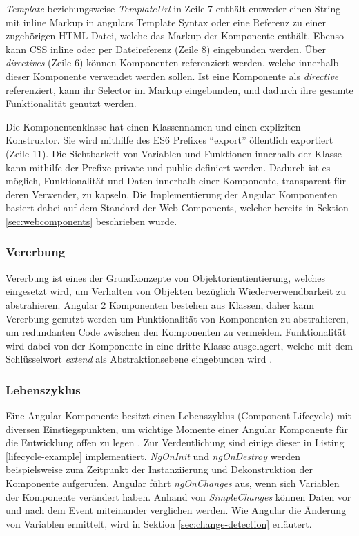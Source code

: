 \emph{Template} beziehungsweise \emph{TemplateUrl} in Zeile 7 enthält entweder einen String mit inline Markup in angulars Template Syntax
oder eine Referenz zu einer zugehörigen HTML Datei, welche das Markup der Komponente enthält.
Ebenso kann \ac{CSS} inline oder per Dateireferenz (Zeile 8) eingebunden werden.
Über \emph{directives} (Zeile 6) können Komponenten referenziert werden, welche innerhalb dieser Komponente verwendet werden sollen.
Ist eine Komponente als \emph{directive} referenziert,
kann ihr Selector im Markup eingebunden,
und dadurch ihre gesamte Funktionalität genutzt werden.

Die Komponentenklasse hat einen Klassennamen und einen expliziten Konstruktor.
Sie wird mithilfe des ES6 Prefixes ``export'' öffentlich exportiert (Zeile 11).
Die Sichtbarkeit von Variablen und Funktionen innerhalb der Klasse kann mithilfe der Prefixe private und public definiert werden.
Dadurch ist es möglich, Funktionalität und Daten innerhalb einer Komponente, transparent für deren Verwender, zu kapseln.
Die Implementierung der Angular Komponenten basiert dabei auf dem Standard der Web Components, welcher bereits in Sektion \ref{sec:webcomponents} beschrieben wurde.

\newpage




\subsubsection{Vererbung}

Vererbung ist eines der Grundkonzepte von Objektorientientierung,
welches eingesetzt wird, um Verhalten von Objekten bezüglich Wiederverwendbarkeit zu
abstrahieren. Angular 2 Komponenten bestehen aus Klassen, daher
kann Vererbung genutzt werden um Funktionalität von Komponenten zu abstrahieren,
um redundanten Code zwischen den Komponenten
zu vermeiden. Funktionalität wird dabei von der Komponente in eine dritte Klasse ausgelagert,
welche mit dem Schlüsselwort \emph{extend} als
Abstraktionsebene eingebunden wird \cite{DanWa45:online}.

\subsubsection{Lebenszyklus}
Eine Angular Komponente besitzt einen Lebenszyklus (Component Lifecycle) mit diversen Einstiegspunkten,
um wichtige Momente einer Angular Komponente für die Entwicklung offen zu legen \cite[837-839]{ng-Book-2}.
Zur Verdeutlichung sind einige dieser in Listing \ref{lifecycle-example} implementiert.
\emph{NgOnInit} und \emph{ngOnDestroy} werden beispielsweise zum Zeitpunkt der Instanziierung und Dekonstruktion der Komponente aufgerufen.
Angular führt \emph{ngOnChanges} aus, wenn sich Variablen der Komponente verändert haben. Anhand von \emph{SimpleChanges}
können Daten vor und nach dem Event miteinander verglichen werden.
Wie Angular die Änderung von Variablen ermittelt, wird in Sektion \ref{sec:change-detection} erläutert.

